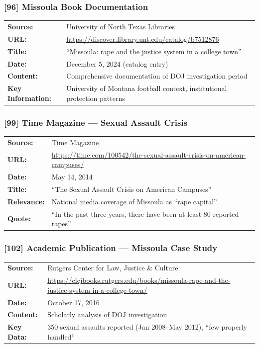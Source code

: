 \documentclass[11pt,letterpaper]{article}
\newcommand{\citeref}[1]{\textbf{\color{NavyBlue}[#1]}}
\begin{document}
\subsubsection{\citeref{96} Missoula Book Documentation}

\begin{tabular}{@{}p{1.4in}p{4.6in}@{}}
\textbf{Source:} & University of North Texas Libraries\\
\textbf{URL:} & \url{https://discover.library.unt.edu/catalog/b7512876}\\
\textbf{Title:} & ``Missoula: rape and the justice system in a college town''\\
\textbf{Date:} & December 5, 2024 (catalog entry)\\
\textbf{Content:} & Comprehensive documentation of DOJ investigation period\\
\textbf{Key Information:} & University of Montana football context, institutional protection patterns\\
\end{tabular}

\subsubsection{\citeref{99} Time Magazine --- Sexual Assault Crisis}

\begin{tabular}{@{}p{1.4in}p{4.6in}@{}}
\textbf{Source:} & Time Magazine\\
\textbf{URL:} & \url{https://time.com/100542/the-sexual-assault-crisis-on-american-campuses/}\\
\textbf{Date:} & May 14, 2014\\
\textbf{Title:} & ``The Sexual Assault Crisis on American Campuses''\\
\textbf{Relevance:} & National media coverage of Missoula as ``rape capital''\\
\textbf{Quote:} & ``In the past three years, there have been at least 80 reported rapes''\\
\end{tabular}

\subsubsection{\citeref{102} Academic Publication --- Missoula Case Study}

\begin{tabular}{@{}p{1.4in}p{4.6in}@{}}
\textbf{Source:} & Rutgers Center for Law, Justice \& Culture\\
\textbf{URL:} & \url{https://clcjbooks.rutgers.edu/books/missoula-rape-and-the-justice-system-in-a-college-town/}\\
\textbf{Date:} & October 17, 2016\\
\textbf{Content:} & Scholarly analysis of DOJ investigation\\
\textbf{Key Data:} & 350 sexual assaults reported (Jan 2008--May 2012), ``few properly handled''\\
\end{tabular}
\end{document}

